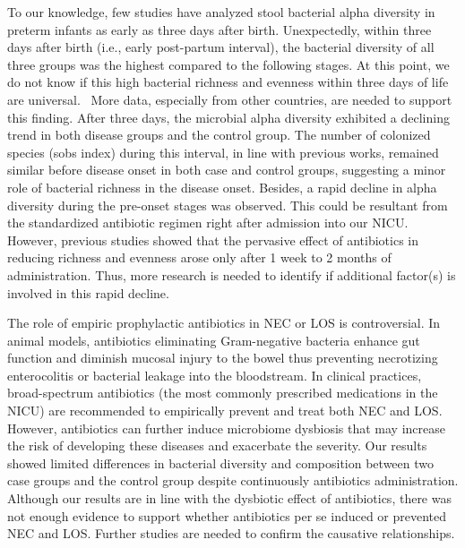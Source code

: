 \documentclass[fleqn,10pt]{wlpeerj} %
\begin{document}
To our knowledge, few studies have analyzed stool bacterial alpha diversity in preterm infants as early as three days after birth. Unexpectedly, within three days after birth (i.e., early post-partum interval), the bacterial diversity of all three groups was the highest compared to the following stages. At this point, we do not know if this high bacterial richness and evenness within three days of life are universal.  More data, especially from other countries, are needed to support this finding. After three days, the microbial alpha diversity exhibited a declining trend in both disease groups and the control group. The number of colonized species (sobs index) during this interval, in line with previous works\citep{mai2011fecal, mai2013distortions}, remained similar before disease onset in both case and control groups, suggesting a minor role of bacterial richness in the disease onset. Besides, a rapid decline in alpha diversity during the pre-onset stages was observed.  This could be resultant from the standardized antibiotic regimen right after admission into our NICU. However, previous studies showed that the pervasive effect of antibiotics in reducing richness and evenness arose only after 1 week to 2 months of administration\citep{digiulio2008microbial, dethlefsen2011incomplete, fouhy2012high, greenwood2014early, tanaka2009influence}. Thus, more research is needed to identify if additional factor(s) is involved in this rapid decline.

The role of empiric prophylactic antibiotics in NEC or LOS is controversial. In animal models, antibiotics eliminating Gram-negative bacteria enhance gut function and diminish mucosal injury to the bowel thus preventing necrotizing enterocolitis or bacterial leakage into the bloodstream\citep{carlisle2011gram, jensen2013antibiotics, birck2015enteral}. In clinical practices, broad-spectrum antibiotics (the most commonly prescribed medications in the NICU) are recommended to empirically prevent and treat both NEC and LOS\citep{bury2001enteral, brook2008microbiology, kimberlin2018red}. However, antibiotics can further induce microbiome dysbiosis that may increase the risk of developing these diseases and exacerbate the severity\citep{gibson2015antibiotics, kuppala2011prolonged, martinez2017early, cantey2018early}. Our results showed limited differences in bacterial diversity and composition between two case groups and the control group despite continuously antibiotics administration.  Although our results are in line with the dysbiotic effect of antibiotics, there was not enough evidence to support whether antibiotics per se induced or prevented NEC and LOS. Further studies are needed to confirm the causative relationships.
\end{document}
